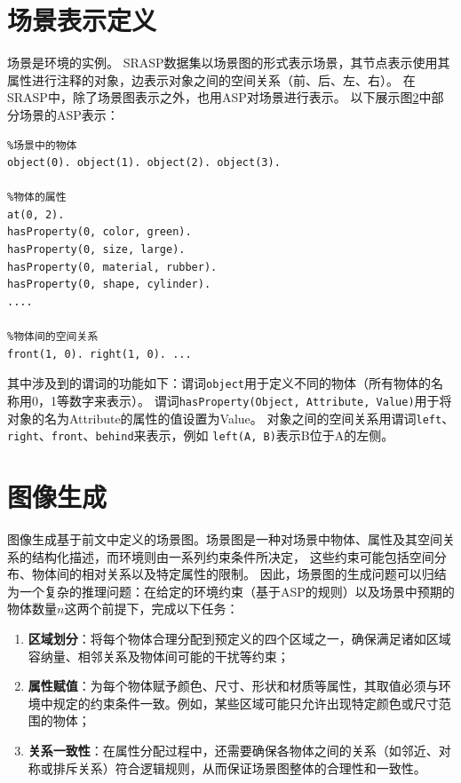 \section{场景表示定义}
场景是环境的实例。
SRASP数据集以场景图的形式表示场景，其节点表示使用其属性进行注释的对象，边表示对象之间的空间关系（前、后、左、右）。
在SRASP中，除了场景图表示之外，也用ASP对场景进行表示。
以下展示图\ref{}中部分场景的ASP​表示：
\begin{lstlisting}
%场景中的物体
object(0). object(1). object(2). object(3).

%物体的属性
at(0, 2).
hasProperty(0, color, green).
hasProperty(0, size, large).
hasProperty(0, material, rubber).
hasProperty(0, shape, cylinder).
....

%物体间的空间关系
front(1, 0). right(1, 0). ...
\end{lstlisting}

其中涉及到的谓词的功能如下：谓词\texttt{object}用于定义不同的物体（所有物体的名称用0，1等数字来表示）。
谓词\texttt{hasProperty(Object, Attribute, Value)}用于将对象的名为Attribute的属性的值设置为Value。
对象之间的空间关系用谓词\texttt{left}、\texttt{right}、\texttt{front}、\texttt{behind}来表示，例如
\texttt{left(A, B)}表示B位于A的左侧。
\section{图像生成}
图像生成基于前文中定义的场景图。场景图是一种对场景中物体、属性及其空间关系的结构化描述，而环境则由一系列约束条件所决定，
这些约束可能包括空间分布、物体间的相对关系以及特定属性的限制。
因此，场景图的生成问题可以归结为一个复杂的推理问题：在给定的环境约束（基于ASP的规则）以及场景中预期的物体数量$n$这两个前提下，完成以下任务：
\begin{enumerate}[itemsep=0pt,parsep=0pt]
\item \textbf{区域划分}：将每个物体合理分配到预定义的四个区域之一，确保满足诸如区域容纳量、相邻关系及物体间可能的干扰等约束；
\item \textbf{属性赋值}：为每个物体赋予颜色、尺寸、形状和材质等属性，其取值必须与环境中规定的约束条件一致。例如，某些区域可能只允许出现特定颜色或尺寸范围的物体；
\item \textbf{关系一致性}：在属性分配过程中，还需要确保各物体之间的关系（如邻近、对称或排斥关系）符合逻辑规则，从而保证场景图整体的合理性和一致性。
\end{enumerate}


